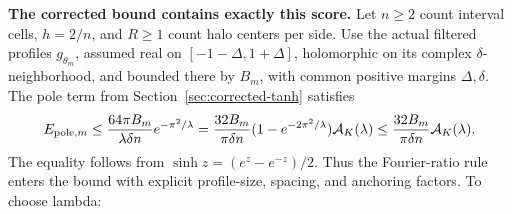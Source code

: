 \documentclass[11pt,letterpaper]{article}
\theoremstyle{definition}
\theoremstyle{remark}
\begin{document}
\textbf{The corrected bound contains exactly this score.}
Let \(n\ge2\) count interval cells, \(h=2/n\), and \(R\ge1\) count halo
centers per side. Use the actual filtered profiles \(g_{\theta_m}\), assumed
real on \([-1-\Delta,1+\Delta]\), holomorphic on its complex
\(\delta\)-neighborhood, and bounded there by \(B_m\), with common positive
margins \(\Delta,\delta\). The pole term from
Section~\ref{sec:corrected-tanh} satisfies
\begin{equation}\label{eq:lambda-ratio-bridge}
 E_{{\rm pole},m}
 \le\frac{64\pi B_m}{\lambda\delta n}e^{-\pi^2/\lambda}
 =\frac{32B_m}{\pi\delta n}(1-e^{-2\pi^2/\lambda})\mathcal A_K(\lambda)
 \le\frac{32B_m}{\pi\delta n}\mathcal A_K(\lambda).
\end{equation}
The equality follows from \(\sinh z=(e^z-e^{-z})/2\).
Thus the Fourier-ratio rule enters the bound with explicit profile-size,
spacing, and anchoring factors. To choose lambda:
\end{document}
